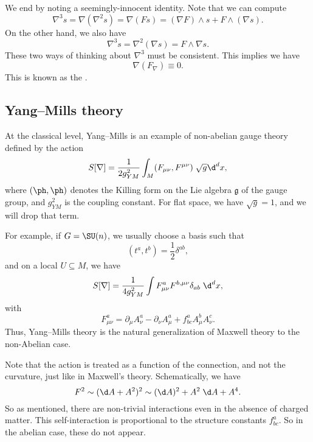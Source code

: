 \documentclass[a4paper]{article}
\begin{document}
We end by noting a seemingly-innocent identity. Note that we can compute
\[
  \nabla^3 s = \nabla(\nabla^2 s) = \nabla(F s) = (\nabla F)\wedge s + F\wedge (\nabla s).
\]
On the other hand, we also have
\[
  \nabla^3 s = \nabla^2 (\nabla s) = F \wedge \nabla s.
\]
These two ways of thinking about $\nabla^3$ must be consistent. This implies we have
\[
  \nabla (F_\nabla) \equiv 0.
\]
This is known as the .

\subsection{Yang--Mills theory}
At the classical level, Yang--Mills is an example of non-abelian gauge theory defined by the action %
\[
  S[\nabla] = \frac{1}{2g^2_{YM}} \int_M (F_{\mu\nu}, F^{\mu\nu}) \;\sqrt{g} \d^d x,
\]
where $(\ph, \ph)$ denotes the Killing form on the Lie algebra $\mathfrak{g}$ of the gauge group, and $g^2_{YM}$ is the coupling constant. For flat space, we have $\sqrt{g} = 1$, and we will drop that term.

For example, if $G = \SU(n)$, we usually choose a basis such that
\[
  (t^a, t^b) = \frac{1}{2} \delta^{ab},
\]
and on a local $U \subseteq M$, we have
\[
  S[\nabla] = \frac{1}{4 g^2_{YM}} \int F_{\mu\nu}^a F^{b, \mu\nu} \delta_{ab} \; \d^d x,
\]
with
\[
  F_{\mu\nu}^a = \partial_\mu A^a_\nu - \partial_\nu A_\mu^a + f^a_{bc} A_\mu^b A_\nu^c.
\]
Thus, Yang--Mills theory is the natural generalization of Maxwell theory to the non-Abelian case.

Note that the action is treated as a function of the connection, and not the curvature, just like in Maxwell's theory. Schematically, we have
\[
  F^2 \sim (\d A + A^2)^2 \sim (\d A)^2 + A^2 \;\d A + A^4.
\]
So as mentioned, there are non-trivial interactions even in the absence of charged matter. This self-interaction is proportional to the structure constants $f^a_{bc}$. So in the abelian case, these do not appear.
\end{document}
